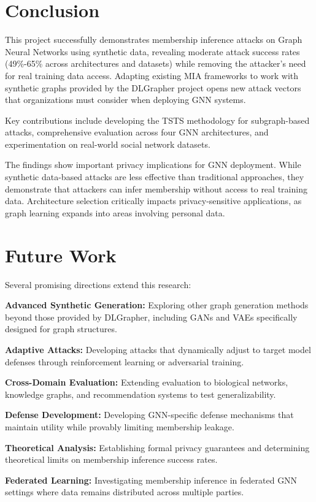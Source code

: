 \documentclass{article}
\begin{document}
\section{Conclusion}
This project successfully demonstrates membership inference attacks on Graph Neural Networks using synthetic data, revealing moderate attack success rates (49\%-65\% across architectures and datasets) while removing the attacker's need for real training data access. Adapting existing MIA frameworks to work with synthetic graphs provided by the DLGrapher project opens new attack vectors that organizations must consider when deploying GNN systems.

Key contributions include developing the TSTS methodology for subgraph-based attacks, comprehensive evaluation across four GNN architectures, and experimentation on real-world social network datasets.

The findings show important privacy implications for GNN deployment. While synthetic data-based attacks are less effective than traditional approaches, they demonstrate that attackers can infer membership without access to real training data. Architecture selection critically impacts privacy-sensitive applications, as graph learning expands into areas involving personal data.

\section{Future Work}
Several promising directions extend this research:

\textbf{Advanced Synthetic Generation:} Exploring other graph generation methods beyond those provided by DLGrapher, including GANs and VAEs specifically designed for graph structures.

\textbf{Adaptive Attacks:} Developing attacks that dynamically adjust to target model defenses through reinforcement learning or adversarial training.

\textbf{Cross-Domain Evaluation:} Extending evaluation to biological networks, knowledge graphs, and recommendation systems to test generalizability.

\textbf{Defense Development:} Developing GNN-specific defense mechanisms that maintain utility while provably limiting membership leakage.

\textbf{Theoretical Analysis:} Establishing formal privacy guarantees and determining theoretical limits on membership inference success rates.

\textbf{Federated Learning:} Investigating membership inference in federated GNN settings where data remains distributed across multiple parties.





\end{document}
